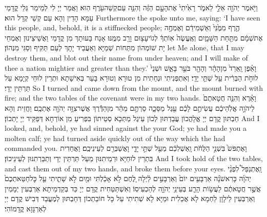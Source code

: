 {וַיֹּ֥אמֶר יְהֹוָ֖ה אֵלַ֣י לֵאמֹ֑ר רָאִ֙יתִי֙ אֶת\maqqaf הָעָ֣ם הַזֶּ֔ה וְהִנֵּ֥ה עַם\maqqaf קְשֵׁה\maqqaf עֹ֖רֶף הֽוּא׃}
{וַאֲמַר יְיָ לִי לְמֵימַר גְּלֵי קֳדָמַי עַמָּא הָדֵין וְהָא עַם קְשֵׁי קְדָל הוּא׃}
{Furthermore the \lord\space spoke unto me, saying: ‘I have seen this people, and, behold, it is a stiffnecked people;}{}
{הֶ֤רֶף מִמֶּ֙נִּי֙ וְאַשְׁמִידֵ֔ם וְאֶמְחֶ֣ה אֶת\maqqaf שְׁמָ֔ם מִתַּ֖חַת הַשָּׁמָ֑יִם וְאֶֽעֱשֶׂה֙ אֽוֹתְךָ֔ לְגוֹי\maqqaf עָצ֥וּם וָרָ֖ב מִמֶּֽנּוּ׃}
{אָנַח בָּעוּתָךְ מִן קֳדָמַי וַאֲשֵׁיצֵינוּן וְאֶמְחֵי יָת שׁוֹמְהוֹן מִתְּחוֹת שְׁמַיָּא וְאַעֲבֵיד יָתָךְ לְעַם תַּקִּיף וְסַגִּי מִנְּהוֹן׃}
{let Me alone, that I may destroy them, and blot out their name from under heaven; and I will make of thee a nation mightier and greater than they.’}{}
{וָאֵ֗פֶן וָֽאֵרֵד֙ מִן\maqqaf הָהָ֔ר וְהָהָ֖ר בֹּעֵ֣ר בָּאֵ֑שׁ וּשְׁנֵי֙ לוּחֹ֣ת הַבְּרִ֔ית עַ֖ל שְׁתֵּ֥י יָדָֽי׃}
{וְאִתְפְּנִיתִי וּנְחַתִית מִן טוּרָא וְטוּרָא בָּעַר בְּאִישָׁתָא וּתְרֵין לוּחֵי קְיָמָא עַל תַּרְתֵּין יְדָי׃}
{So I turned and came down from the mount, and the mount burned with fire; and the two tables of the covenant were in my two hands.}{}
{וָאֵ֗רֶא וְהִנֵּ֤ה חֲטָאתֶם֙ לַיהֹוָ֣ה אֱלֹֽהֵיכֶ֔ם עֲשִׂיתֶ֣ם לָכֶ֔ם עֵ֖גֶל מַסֵּכָ֑ה סַרְתֶּ֣ם מַהֵ֔ר מִן\maqqaf הַדֶּ֕רֶךְ אֲשֶׁר\maqqaf צִוָּ֥ה יְהֹוָ֖ה אֶתְכֶֽם׃}
{וַחֲזֵית וְהָא חַבְתּוּן קֳדָם יְיָ אֱלָהֲכוֹן עֲבַדְתּוּן לְכוֹן עֵיגֶל מַתְּכָא סְטֵיתוֹן בִּפְרִיעַ מִן אוֹרְחָא דְּפַקֵּיד יְיָ יָתְכוֹן׃}
{And I looked, and, behold, ye had sinned against the \lord\space your God; ye had made you a molten calf; ye had turned aside quickly out of the way which the \lord\space had commanded you.}{}
{וָאֶתְפֹּשׂ֙ בִּשְׁנֵ֣י הַלֻּחֹ֔ת וָֽאַשְׁלִכֵ֔ם מֵעַ֖ל שְׁתֵּ֣י יָדָ֑י וָאֲשַׁבְּרֵ֖ם לְעֵינֵיכֶֽם׃}
{וַאֲחַדִית בִּתְרֵין לוּחַיָּא וּרְמֵיתִנּוּן מֵעַל תַּרְתֵּין יְדָי וְתַבַּרְתִנּוּן לְעֵינֵיכוֹן׃}
{And I took hold of the two tables, and cast them out of my two hands, and broke them before your eyes.}{}
{וָֽאֶתְנַפַּל֩ לִפְנֵ֨י יְהֹוָ֜ה כָּרִאשֹׁנָ֗ה אַרְבָּעִ֥ים יוֹם֙ וְאַרְבָּעִ֣ים לַ֔יְלָה לֶ֚חֶם לֹ֣א אָכַ֔לְתִּי וּמַ֖יִם לֹ֣א שָׁתִ֑יתִי עַ֤ל כׇּל\maqqaf חַטַּאתְכֶם֙ אֲשֶׁ֣ר חֲטָאתֶ֔ם לַעֲשׂ֥וֹת הָרַ֛ע בְּעֵינֵ֥י יְהֹוָ֖ה לְהַכְעִיסֽוֹ׃}
{וְאִשְׁתַּטַּחִית קֳדָם יְיָ כַּד בְּקַדְמֵיתָא אַרְבְּעִין יְמָמִין וְאַרְבְּעִין לֵילָוָן לַחְמָא לָא אֲכַלִית וּמַיָּא לָא שְׁתִיתִי עַל כָּל חוֹבַתְכוֹן דְּחַבְתּוּן לְמֶעֱבַד דְּבִישׁ קֳדָם יְיָ לְאַרְגָּזָא קֳדָמוֹהִי׃}
